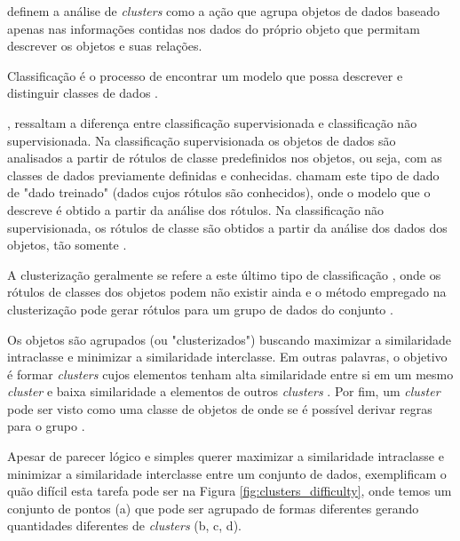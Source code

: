  definem a análise de \textit{clusters} como a ação que agrupa objetos de dados baseado apenas nas informações contidas
nos dados do próprio objeto que permitam descrever os objetos e suas relações. 

Classificação é o processo de encontrar um modelo que possa descrever e distinguir classes de dados \cite{han2011data}.

,  ressaltam a diferença entre classificação supervisionada e classificação não supervisionada.
Na classificação supervisionada os objetos de dados são analisados a partir de rótulos de classe predefinidos nos objetos, ou seja, 
com as classes de dados previamente definidas e conhecidas.  chamam este tipo de dado de "dado treinado"
(dados cujos rótulos são conhecidos), onde o modelo que o descreve é obtido a partir da análise dos rótulos.
Na classificação não supervisionada, os rótulos de classe são obtidos a partir da análise dos dados dos objetos, tão somente \cite{tan2013data}.

A clusterização geralmente se refere a este último tipo de classificação \cite{tan2013data}, onde os rótulos de classes dos objetos podem não existir ainda e 
o método empregado na clusterização pode gerar rótulos para um grupo de dados do conjunto \cite{han2011data}.

Os objetos são agrupados (ou "clusterizados") buscando maximizar a similaridade intraclasse e minimizar a similaridade interclasse.
Em outras palavras, o objetivo é formar \textit{clusters} cujos elementos tenham alta similaridade entre si em um mesmo \textit{cluster} 
e baixa similaridade a elementos de outros \textit{clusters} \cite{han2011data}. Por fim, um \textit{cluster} pode ser visto como uma
classe de objetos de onde se é possível derivar regras para o grupo \cite{han2011data}.

Apesar de parecer lógico e simples querer maximizar a similaridade intraclasse e minimizar a similaridade interclasse entre um conjunto de dados, 
 exemplificam o quão difícil esta tarefa pode ser na Figura \ref{fig:clusters_difficulty}, onde temos um conjunto
de pontos (a) que pode ser agrupado de formas diferentes gerando quantidades diferentes de \textit{clusters} (b, c, d).

